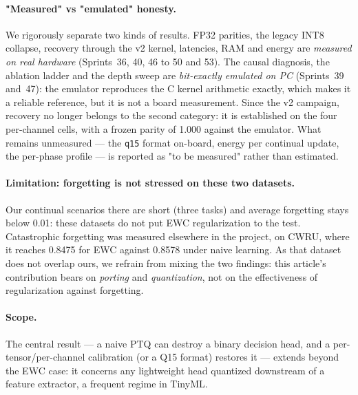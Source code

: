 \paragraph{"Measured" vs "emulated" honesty.} We rigorously separate two kinds of results. FP32 parities, the
legacy INT8 collapse, recovery through the v2 kernel, latencies, RAM and energy are \emph{measured on real
hardware} (Sprints~36, 40, 46 to 50 and 53). The causal diagnosis, the ablation ladder and the depth sweep
are \emph{bit-exactly emulated on PC} (Sprints~39 and~47): the emulator reproduces the C kernel arithmetic
exactly, which makes it a reliable reference, but it is not a board measurement. Since the v2 campaign,
recovery no longer belongs to the second category: it is established on the four per-channel cells, with a
frozen parity of \num{1.000} against the emulator. What remains unmeasured --- the \texttt{q15} format
on-board, energy per continual update, the per-phase profile --- is reported as "to be measured" rather than
estimated.

\paragraph{Limitation: forgetting is not stressed on these two datasets.} Our continual scenarios there are
short (three tasks) and average forgetting stays below \num{0.01}: these datasets do not put EWC
regularization to the test. Catastrophic forgetting was measured elsewhere in the project, on CWRU, where it
reaches \num{0.8475} for EWC against \num{0.8578} under naive learning. As that dataset does not overlap
ours, we refrain from mixing the two findings: this article's contribution bears on \emph{porting} and
\emph{quantization}, not on the effectiveness of regularization against forgetting.

\paragraph{Scope.} The central result --- a naive PTQ can destroy a binary decision head, and a
per-tensor/per-channel calibration (or a Q15 format) restores it --- extends beyond the EWC case: it concerns
any lightweight head quantized downstream of a feature extractor, a frequent regime in TinyML.
